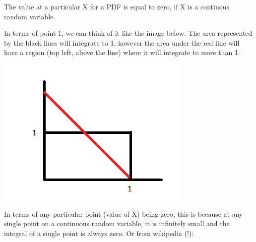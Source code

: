 \documentclass[]{book}
\theoremstyle{definition}
\theoremstyle{definition}
\theoremstyle{definition}
\theoremstyle{remark}
\begin{document}
The value at a particular X for a PDF is equal to zero, if X is a
continous random variable.

In terms of point 1, we can think of it like the image below. The area
represented by the black lines will integrate to 1, however the area
under the red line will have a region (top left, above the line) where
it will integrate to more than 1.

\includegraphics[width=1\linewidth]{images/PDF1}

In terms of any particular point (value of X) being zero, this is
because at any single point on a continuous random variable, it is
infinitely small and the integral of a single point is always zero. Or
from wikipedia (!):
\end{document}
